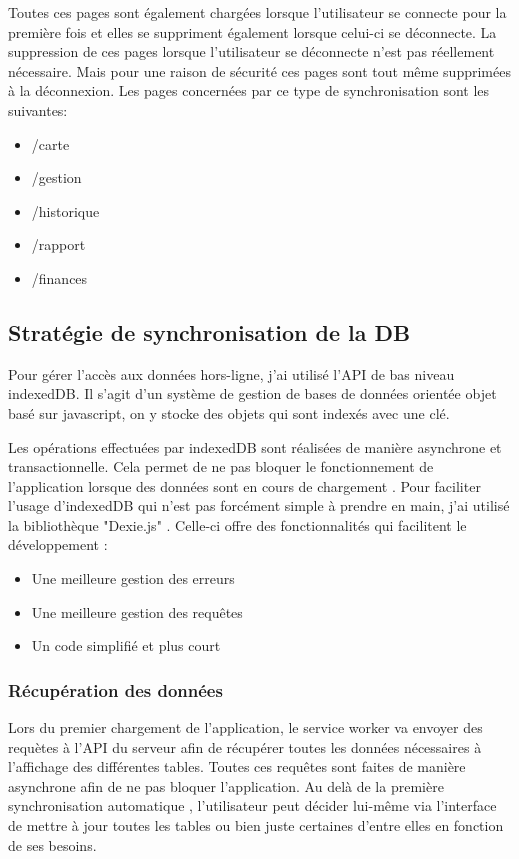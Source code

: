 \documentclass{EPL-master-thesis-covers-FR}
\begin{document}
					Toutes ces pages sont également chargées lorsque l'utilisateur se connecte pour la première fois et elles se suppriment également lorsque celui-ci se déconnecte. La suppression de ces pages lorsque l'utilisateur se déconnecte n'est pas réellement nécessaire. Mais pour une raison de sécurité ces pages sont tout même supprimées à la déconnexion. Les pages concernées par ce type de synchronisation sont les suivantes:
					\begin{itemize}
						\item /carte
						\item /gestion
						\item /historique
						\item /rapport
						\item /finances
					\end{itemize}					
				
					
			\subsection{Stratégie de synchronisation de la DB}
				Pour gérer l'accès aux données hors-ligne, j'ai utilisé l'API de bas niveau indexedDB. Il s'agit d'un système de gestion de bases de données orientée objet basé sur javascript, on y stocke des objets qui sont indexés avec une clé. 
				
				Les opérations effectuées par indexedDB sont réalisées de manière asynchrone et transactionnelle. Cela permet de ne pas bloquer le fonctionnement de l'application lorsque des données sont en cours de chargement \cite{ref:indexedDB}. Pour faciliter l'usage d'indexedDB qui n'est pas forcément simple à prendre en main, j'ai utilisé la bibliothèque "Dexie.js" \cite{ref:dexie}. Celle-ci offre des fonctionnalités qui facilitent le développement : 
				\begin{itemize}
					\item Une meilleure gestion des erreurs
					\item Une meilleure gestion des requêtes
					\item Un code simplifié et plus court
				\end{itemize}					
				
				\subsubsection*{Récupération des données}
					Lors du premier chargement de l'application, le service worker va envoyer des requètes à l'API du serveur afin de récupérer toutes les données nécessaires à l'affichage des différentes tables. Toutes ces requêtes sont faites de manière asynchrone afin de ne pas bloquer l'application. Au delà de la première synchronisation automatique , l'utilisateur peut décider lui-même via l'interface de mettre à jour toutes les tables ou bien juste certaines d'entre elles en fonction de ses besoins.
				
\end{document}
